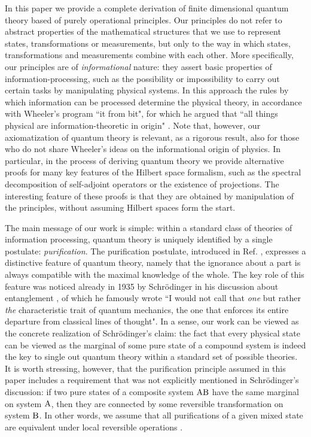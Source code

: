 \documentclass[12pt,aps,pra,showpacs,groupedaddress]{revtex4-1}
\def\rB{{\rm B}}
\begin{document}
In this paper we provide a complete derivation of finite dimensional quantum theory based of purely operational
principles. Our principles do not refer to abstract properties of the mathematical structures that we use to represent
states, transformations or measurements, but only to the way in which states, transformations and measurements combine with each other.  More specifically, our principles are of \emph{informational} nature:  they assert basic properties of information-processing, such as the possibility or impossibility to carry
out certain  tasks by manipulating physical systems. In this approach the rules by which information can be processed determine the physical theory,  in  accordance with Wheeler's program ``it from bit", for which he argued that   ``all things physical are information-theoretic in origin" \cite{wheeler}.   Note that, however, our axiomatization of quantum theory is relevant, as a rigorous result,  also for those who do not share Wheeler's ideas on the informational origin of physics. In particular, in the process of deriving quantum theory we provide alternative proofs for many key features of the Hilbert space formalism, such as the spectral decomposition of  self-adjoint operators or the existence of projections.  The interesting feature of these proofs is that they are obtained by manipulation of the principles, without assuming Hilbert spaces form the start. 



The main message of our work is simple: within a standard class of theories of information processing,
quantum theory is uniquely identified by a single postulate: \emph{purification}.  The purification
postulate, introduced in Ref. \cite{purification}, expresses a distinctive feature of quantum
theory, namely that the ignorance about a part is always compatible with the maximal knowledge of the
whole. The key role of this feature was noticed already in 1935 by Schr\"odinger in his discussion
about entanglement \cite{Schr35}, of which he famously wrote ``I would not call that \emph{one} but
rather {\em the} characteristic trait of quantum mechanics, the one that enforces its entire
departure from classical lines of thought".  In a sense, our work can be viewed as the concrete
realization of Schr\"odinger's claim: the fact that every physical state can be viewed as the
marginal of some pure state of a compound system is indeed the key to single out quantum theory within a standard set of possible theories.  It
is worth stressing, however, that the purification principle assumed in this paper includes a requirement that was not explicitly mentioned in Schr\"odinger's discussion: if two pure states of a composite system $\rA\rB$ have the same marginal on system ${\rm A}$, then they are connected by some
reversible transformation on system $\rB$.  In other words, we assume that all purifications of a given mixed state are equivalent under local reversible operations
\cite{anchese...}.    
\end{document}
